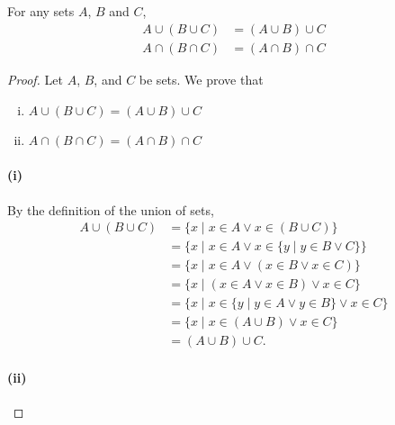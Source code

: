 \documentclass{report}
\begin{document}
\subsection{}%
\label{sub:associative-laws}

For any sets $A$, $B$ and $C$,
  \begin{align*}
    A \cup (B \cup C) & = (A \cup B) \cup C \\
    A \cap (B \cap C) & = (A \cap B) \cap C
  \end{align*}

\begin{proof}

  \statementpadding



  \noindent Let $A$, $B$, and $C$ be sets.
  We prove that
    \begin{enumerate}[(i)]
      \item $A \cup (B \cup C) = (A \cup B) \cup C$
      \item $A \cap (B \cap C) = (A \cap B) \cap C$
    \end{enumerate}

  \paragraph{(i)}%

    By the definition of the union of sets,
      \begin{align*}
        A \cup (B \cup C)
          & = \{ x \mid x \in A \lor x \in (B \cup C) \} \\
          & = \{ x \mid x \in A \lor x \in \{ y \mid y \in B \lor C \}\} \\
          & = \{ x \mid x \in A \lor (x \in B \lor x \in C) \} \\
          & = \{ x \mid (x \in A \lor x \in B) \lor x \in C \} \\
          & = \{ x \mid x \in \{ y \mid y \in A \lor y \in B \} \lor
                        x \in C \} \\
          & = \{ x \mid x \in (A \cup B) \lor x \in C \} \\
          & = (A \cup B) \cup C.
      \end{align*}

  \paragraph{(ii)}%


\end{proof}
\end{document}
